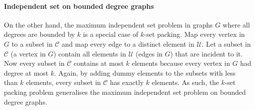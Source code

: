 



\paragraph{Independent set on bounded degree graphs} On the other hand, the maximum independent set problem in graphs $G$ where all degrees are bounded by $k$ is a special case of $k$-set packing. Map every vertex in $G$ to a subset in $\mathcal{C}$ and map every edge to a distinct element in $\mathcal{U}$. Let a subset in $\mathcal{C}$ (a vertex in $G$) contain all elements in $\mathcal{U}$ (edges in $G$) that are incident to it. Now every subset in $\mathcal{C}$ contains at most $k$ elements because every vertex in $G$ had degree at most $k$. Again, by adding dummy elements to the subsets with less than $k$ elements, every subset in $\mathcal{C}$ has exactly $k$ elements. As such, the $k$-set packing problem generalises the maximum independent set problem on bounded degree graphs.

